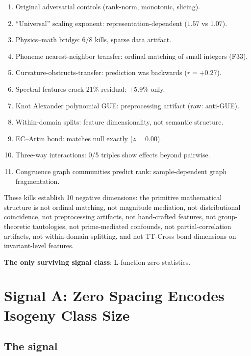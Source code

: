 \documentclass[11pt,a4paper]{article}
\begin{document}
\begin{enumerate}[nosep]
  \item[1--8.] Original adversarial controls (rank-norm, monotonic, slicing).
  \item[9.] ``Universal'' scaling exponent: representation-dependent ($1.57$ vs $1.07$).
  \item[10.] Physics--math bridge: 6/8 kills, sparse data artifact.
  \item[11.] Phoneme nearest-neighbor transfer: ordinal matching of small integers (F33).
  \item[12.] Curvature-obstructs-transfer: prediction was backwards ($r = +0.27$).
  \item[13.] Spectral features crack 21\% residual: $+5.9\%$ only.
  \item[14.] Knot Alexander polynomial GUE: preprocessing artifact (raw: anti-GUE).
  \item[15.] Within-domain splits: feature dimensionality, not semantic structure.
  \item[16.] EC--Artin bond: matches null exactly ($z = 0.00$).
  \item[17.] Three-way interactions: 0/5 triples show effects beyond pairwise.
  \item[18.] Congruence graph communities predict rank: sample-dependent graph fragmentation.
\end{enumerate}

These kills establish 10 negative dimensions: the primitive mathematical structure is not ordinal matching, not magnitude mediation, not distributional coincidence, not preprocessing artifacts, not hand-crafted features, not group-theoretic tautologies, not prime-mediated confounds, not partial-correlation artifacts, not within-domain splitting, and not TT-Cross bond dimensions on invariant-level features.

\textbf{The only surviving signal class}: L-function zero statistics.

\section{Signal A: Zero Spacing Encodes Isogeny Class Size}
\label{sec:signal_a}

\subsection{The signal}
\end{document}
